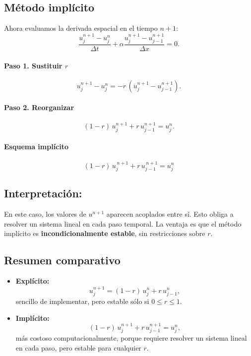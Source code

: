 \documentclass[12pt,a4paper]{article}
\begin{document}
\subsection{Método implícito}

Ahora evaluamos la derivada espacial en el tiempo $n+1$:
\[
\frac{u_j^{n+1}-u_j^n}{\Delta t} + \alpha \frac{u_j^{n+1} - u_{j-1}^{n+1}}{\Delta x} = 0.
\]

\paragraph{Paso 1. Sustituir $r$}  
\[
u_j^{n+1} - u_j^n = -r\,(u_j^{n+1} - u_{j-1}^{n+1}).
\]

\paragraph{Paso 2. Reorganizar}  
\[
(1-r)\,u_j^{n+1} + r\,u_{j-1}^{n+1} = u_j^n.
\]

\paragraph{Esquema implícito}  
\[
\boxed{(1-r)\,u_j^{\,n+1} + r\,u_{j-1}^{\,n+1} = u_j^n}
\]

\subsection*{Interpretación:}
En este caso, los valores de $u^{n+1}$ aparecen acoplados entre sí.  
Esto obliga a resolver un sistema lineal en cada paso temporal.  
La ventaja es que el método implícito es \textbf{incondicionalmente estable}, sin restricciones sobre $r$.

\subsection{Resumen comparativo}

\begin{itemize}
    \item \textbf{Explícito:}  
    \[
    u_j^{n+1} = (1-r)\,u_j^n + r\,u_{j-1}^n,
    \]
    sencillo de implementar, pero estable sólo si $0 \leq r \leq 1$.

    \item \textbf{Implícito:}  
    \[
    (1-r)\,u_j^{n+1} + r\,u_{j-1}^{n+1} = u_j^n,
    \]
    más costoso computacionalmente, porque requiere resolver un sistema lineal en cada paso, pero estable para cualquier $r$.
\end{itemize}
\end{document}
